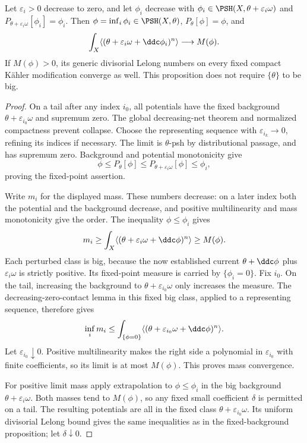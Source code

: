 \begin{proposition}\label{prop:perturbed-model-limit-mass}
Let $\varepsilon_i>0$ decrease to zero, and let $\phi_i$ decrease with
$\phi_i\in\PSH(X,\theta+\varepsilon_i\omega)$ and
$P_{\theta+\varepsilon_i\omega}[\phi_i]=\phi_i$. Then $\phi=\inf_i\phi_i\in\PSH(X,\theta)$, $P_\theta[\phi]=\phi$, and
\[
 \int_X\langle(\theta+\varepsilon_i\omega+\ddc\phi_i)^n\rangle
                                  \longrightarrow M(\phi).
\]
If $M(\phi)>0$, its generic divisorial Lelong numbers on every fixed compact K\"ahler modification converge as well. This proposition does not require $\{\theta\}$ to be big.
\end{proposition}
\begin{proof}
On a tail after any index $i_0$, all potentials have the fixed background $\theta+\varepsilon_{i_0}\omega$ and supremum zero. The global decreasing-net theorem and normalized compactness prevent collapse. Choose the representing sequence with $\varepsilon_{i_k}\to0$, refining its indices if necessary. The limit is $\theta$-psh by distributional passage, and has supremum zero. Background and potential monotonicity give
\[
 \phi\leq P_\theta[\phi]
       \leq P_{\theta+\varepsilon_i\omega}[\phi]
       \leq\phi_i,
\]
proving the fixed-point assertion.

Write $m_i$ for the displayed mass. These numbers decrease: on a later index both the potential and the background decrease, and positive multilinearity and mass monotonicity give the order. The inequality $\phi\leq\phi_i$ gives
\[
 m_i\geq\int_X\langle(\theta+\varepsilon_i\omega+\ddc\phi)^n\rangle
                                                        \geq M(\phi).
\]
Each perturbed class is big, because the now established current $\theta+\ddc\phi$ plus $\varepsilon_i\omega$ is strictly positive. Its fixed-point measure is carried by $\{\phi_i=0\}$. Fix $i_0$. On the tail, increasing the background to $\theta+\varepsilon_{i_0}\omega$ only increases the measure. The decreasing-zero-contact lemma in this fixed big class, applied to a representing sequence, therefore gives
\[
 \inf_i m_i
       \leq\int_{\{\phi=0\}}
                  \langle(\theta+\varepsilon_{i_0}\omega+\ddc\phi)^n\rangle.
\]
Let $\varepsilon_{i_0}\downarrow0$. Positive multilinearity makes the right side a polynomial in $\varepsilon_{i_0}$ with finite coefficients, so its limit is at most $M(\phi)$. This proves mass convergence.

For positive limit mass apply extrapolation to $\phi\leq\phi_i$ in the big background $\theta+\varepsilon_i\omega$. Both masses tend to $M(\phi)$, so any fixed small coefficient $\delta$ is permitted on a tail. The resulting potentials are all in the fixed class $\theta+\varepsilon_{i_0}\omega$. Its uniform divisorial Lelong bound gives the same inequalities as in the fixed-background proposition; let $\delta\downarrow0$.
\end{proof}

